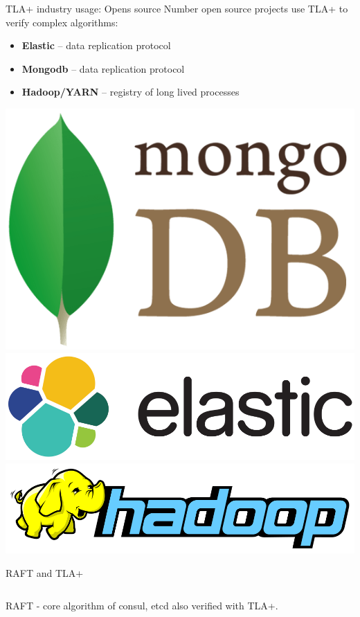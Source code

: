\documentclass[12pt]{beamer}
\begin{document}
  \begin{frame}{TLA+ industry usage: Opens source}
      Number open source projects use TLA+ to verify complex algorithms:
    \begin{itemize}
        \item \textbf{Elastic} -- data replication protocol~\cite{elastic2017}
        \item \textbf{Mongodb} -- data replication protocol~\cite{mongo2016}
        \item \textbf{Hadoop/YARN} -- registry of long lived processes~\cite{hadoop2017}
    \end{itemize}
    \begin{center}
        \includegraphics[scale=0.1]{figures/mongo}
        \includegraphics[scale=0.12]{figures/elastic}
        \includegraphics[scale=0.14]{figures/hadoop}
    \end{center}
  \end{frame}
  \begin{frame}{RAFT and TLA+}
    \begin{center}
          \inputminted[firstline=452,lastline=461,linenos,
            fontsize=\scriptsize]{tla}{figures/raft.tla}
    \end{center}
      RAFT - core algorithm of consul, etcd also verified with TLA+.
  \end{frame}
\end{document}
